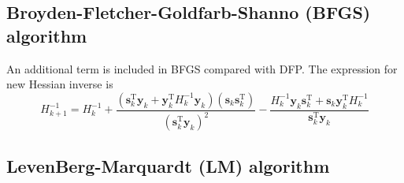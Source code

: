 \documentclass{article}
\begin{document}
\subsection{Broyden-Fletcher-Goldfarb-Shanno (BFGS) algorithm}
An additional term is included in BFGS compared with DFP. The expression for new Hessian inverse is
\begin{equation}
  H_{k+1}^{-1}=H_{k}^{-1}+\frac{\left(\mathbf{s}_{k}^{\mathrm{T}} \mathbf{y}_{k}+\mathbf{y}_{k}^{\mathrm{T}} H_{k}^{-1} \mathbf{y}_{k}\right)\left(\mathbf{s}_{k} \mathbf{s}_{k}^{\mathrm{T}}\right)}{\left(\mathbf{s}_{k}^{\mathrm{T}} \mathbf{y}_{k}\right)^{2}}-\frac{H_{k}^{-1} \mathbf{y}_{k} \mathbf{s}_{k}^{\mathrm{T}}+\mathbf{s}_{k} \mathbf{y}_{k}^{\mathrm{T}} H_{k}^{-1}}{\mathbf{s}_{k}^{\mathrm{T}} \mathbf{y}_{k}}
\end{equation}

\subsection{LevenBerg-Marquardt (LM) algorithm}
\end{document}
